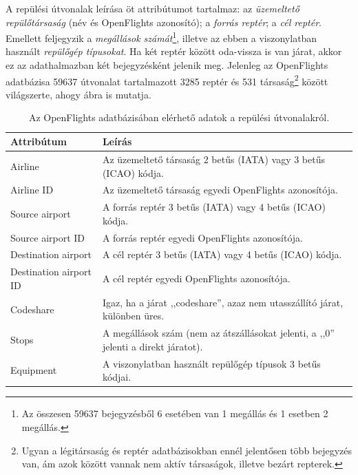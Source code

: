     A repülési útvonalak leírása öt attribútumot tartalmaz: az \emph{üzemeltető repülőtársaság} (név és OpenFlights azonosító); a \emph{forrás reptér}; a \emph{cél reptér}. Emellett feljegyzik a \emph{megállások számát}\footnote{Az összesen 59637 bejegyzésből 6 esetében van 1 megállás és 1 esetben 2 megállás.}, illetve az ebben a viszonylatban használt \emph{repülőgép típusokat}. Ha két reptér között oda-vissza is van járat, akkor ez az adathalmazban két bejegyzésként jelenik meg. Jelenleg az OpenFlights adatbázisa 59637 útvonalat tartalmazott 3285 reptér és 531 társaság\footnote{Ugyan a légitársaság és reptér adatbázisokban ennél jelentősen több bejegyzés van, ám azok között vannak nem aktív társaságok, illetve bezárt repterek.} között világszerte, ahogy  ábra is mutatja.

    \begin{table}[ht]
      \footnotesize
      \centering
      \caption{Az OpenFlights adatbázisában elérhető adatok a repülési útvonalakról.}
      \begin{tabular}{ | l | l |}
      \hline
      Attribútum & Leírás \\ \hline
      Airline & Az üzemeltető társaság 2 betűs (IATA) vagy 3 betűs (ICAO) kódja.\\
      Airline ID & Az üzemeltető társaság egyedi OpenFlights azonosítója.\\
      Source airport & A forrás reptér 3 betűs (IATA) vagy 4 betűs (ICAO) kódja.\\
      Source airport ID & A forrás reptér egyedi OpenFlights azonosítója.\\
      Destination airport & A cél reptér 3 betűs (IATA) vagy 4 betűs (ICAO) kódja.\\
      Destination airport ID & A cél reptér egyedi OpenFlights azonosítója.\\
      Codeshare & Igaz, ha a járat ,,codeshare'', azaz nem utasszállító járat, különben üres.\\
      Stops & A megállások szám (nem az átszállásokat jelenti, a ,,0'' jelenti a direkt járatot).\\
      Equipment & A viszonylatban használt repülőgép típusok 3 betűs kódjai.\\
      \hline
      \end{tabular}
      \label{tab:table_repulesiutvonalak}
    \end{table}\newpage

